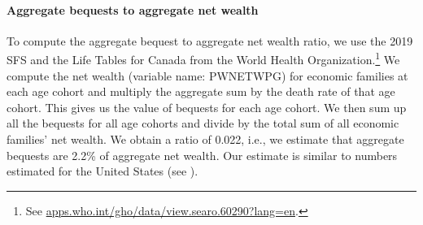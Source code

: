 \documentclass[parskip=full]{article}
\begin{document}
\paragraph{Aggregate bequests to aggregate net wealth}

To compute the aggregate bequest to aggregate net wealth ratio, we use the 2019 SFS and the Life Tables for Canada from the World Health Organization.\footnote{See \url{apps.who.int/gho/data/view.searo.60290?lang=en}.} We compute the net wealth (variable name: PWNETWPG) for economic families at each age cohort and multiply the aggregate sum by the death rate of that age cohort. This gives us the value of bequests for each age cohort. We then sum up all the bequests for all age cohorts and divide by the total sum of all economic families' net wealth. We obtain a ratio of 0.022, i.e., we estimate that aggregate bequests are 2.2\% of aggregate net wealth. Our estimate is similar to numbers estimated for the United States (see \citet{cagetti-denardi-2006}). 

\end{document}
